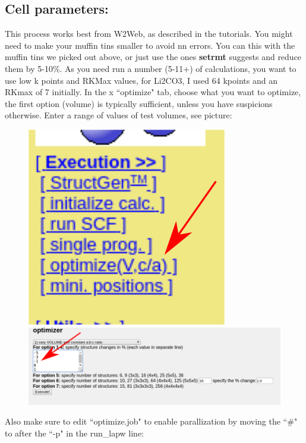 \documentclass[12pt]{article}
\begin{document}
\subsection{Cell parameters:}
This process works best from W2Web, as described in the tutorials.  You might need to make your muffin tins smaller to avoid nn errors.  You can this with the muffin tins we picked out above, or just use the ones \textbf{setrmt} suggests and reduce them by 5-10\%.  As you need run a number (5-11+) of calculations, you want to use low k points and RKMax values, for Li2CO3, I used 64 kpoints and an RKmax of 7 initially.   In the x ``optimize" tab, choose what you want to optimize, the first option (volume) is typically sufficient, unless you have suspicions otherwise.  Enter a range of values of test volumes, see picture:

\begin{figure}[H]

\includegraphics[scale=0.3]{./images/vol_opt_menu.png}
~
\includegraphics[scale=0.3]{./images/vol_opt.png}



\end{figure}


Also make sure to edit ``optimize.job" to enable parallization by moving the ``\#" to after the ``-p" in the run\_lapw line: 
\end{document}
